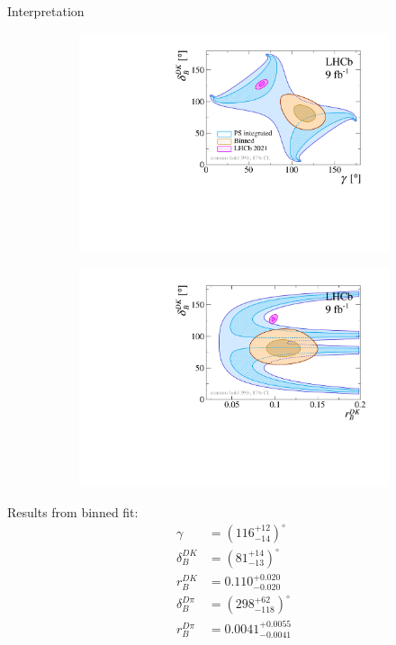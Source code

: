 \documentclass{beamer}
\begin{document}
\begin{frame}{Interpretation}
  \begin{figure}
    \centering
    \begin{subfigure}{0.50\textwidth}
      \includegraphics[width = 1.0\textwidth]{Plots/gammacharm_lhcb_KKpipi_GLW_KKpipi_GGSZ_lhcb_2020_beauty_and_charm_g_d_dk.pdf}
    \end{subfigure}%
    \begin{subfigure}{0.50\textwidth}
      \includegraphics[width = 1.0\textwidth]{Plots/gammacharm_lhcb_KKpipi_GLW_KKpipi_GGSZ_lhcb_2020_beauty_and_charm_r_dk_d_dk.pdf}
    \end{subfigure}
  \end{figure}
  \vspace{-0.75cm}
  Results from binned fit:
  \begin{align*}
    \gamma &= (116^{+12}_{-14})^\circ \\
    \delta_B^{DK} &= (81^{+14}_{-13})^\circ \\
    r_B^{DK} &= 0.110^{+0.020}_{-0.020} \\
    \delta_B^{D\pi} &= (298^{+62}_{-118})^\circ \\
    r_B^{D\pi} &= 0.0041^{+0.0055}_{-0.0041}
  \end{align*}
\end{frame}
\end{document}
